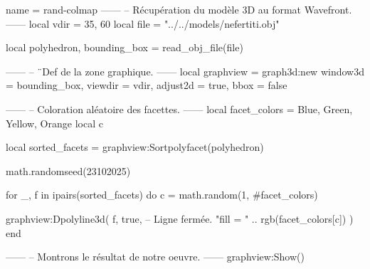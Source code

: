 \documentclass[border = 3pt]{standalone}
\begin{document}
\begin{luadraw*}{name = rand-colmap}
------
-- Récupération du modèle 3D au format Wavefront.
------
local vdir = {35, 60}
local file = "../../models/nefertiti.obj"

local polyhedron, bounding_box = read_obj_file(file)

------
-- ¨Def de la zone graphique.
------
local graphview = graph3d:new{
  window3d = bounding_box,
  viewdir  = vdir,
  adjust2d = true,
  bbox     = false
}

------
-- Coloration aléatoire des facettes.
------
local facet_colors = {Blue, Green, Yellow, Orange}
local c

local sorted_facets = graphview:Sortpolyfacet(polyhedron)

math.randomseed(23102025)

for _, f in ipairs(sorted_facets) do
  c = math.random(1, #facet_colors)

  graphview:Dpolyline3d(
    f,
    true,  -- Ligne fermée.
    "fill = " .. rgb(facet_colors[c])
  )
end

------
-- Montrons le résultat de notre oeuvre.
------
graphview:Show()
\end{luadraw*}
\end{document}
